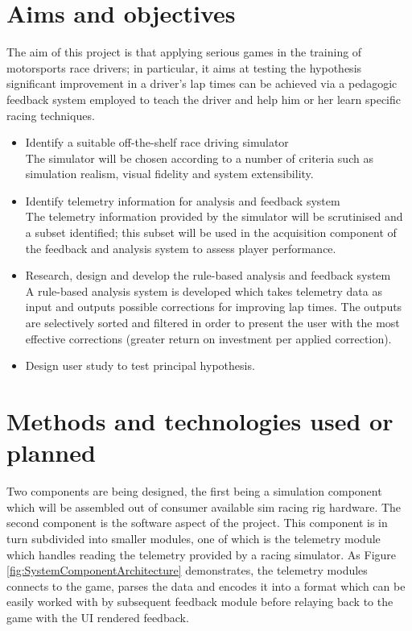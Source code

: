 \documentclass{article}
\begin{document}
\section{Aims and objectives}

The aim of this project is that applying serious games in the training of motorsports race drivers; in particular, it aims at testing the hypothesis significant improvement in a driver's lap times can be achieved via a pedagogic feedback system employed to teach the driver and help him or her learn specific racing techniques.

\begin{itemize}
  \item Identify a suitable off-the-shelf race driving simulator \\
  	The simulator will be chosen according to a number of criteria such as simulation realism, visual fidelity and system extensibility.

  \item Identify telemetry information for analysis and feedback system \\
  	The telemetry information provided by the simulator will be scrutinised and a subset identified; this subset will be used in the acquisition component of the feedback and analysis system to assess player performance.

  \item Research, design and develop the rule-based analysis and feedback system \\
  	A rule-based analysis system is developed which takes telemetry data as input and outputs possible corrections for improving lap times. The outputs are selectively sorted and filtered in order to present the user with the most effective corrections (greater return on investment per applied correction).

  \item Design user study to test principal hypothesis.
\end{itemize}

\section{Methods and technologies used or planned}

Two components are being designed, the first being a simulation component which will be assembled out of consumer available sim racing rig hardware. The second component is the software aspect of the project. This component is in turn subdivided into smaller modules, one of which is the telemetry module which handles reading the telemetry provided by a racing simulator. As Figure \ref{fig:SystemComponentArchitecture} demonstrates, the telemetry modules connects to the game, parses the data and encodes it into a format which can be easily worked with by subsequent feedback module before relaying back to the game with the UI rendered feedback.
\end{document}
